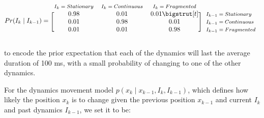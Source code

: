 \documentclass[times, twoside]{zHenriquesLab-StyleBioRxiv}
\begin{document}
\begin{equation*}
  Pr(I_{k} \mid I_{k-1}) = 
  \begin{blockarray}{*{3}{c} l}
    \begin{block}{*{3}{>{$\footnotesize}c<{$}} l}
      $I_{k} = Stationary$ & $I_{k} = Continuous$ & $I_{k} = Fragmented$ \\
    \end{block}
    \begin{block}{[*{3}{c}]>{$\footnotesize}l<{$}}
      0.98 & 0.01 & 0.01 \bigstrut[t]& $I_{k-1} = Stationary$ \\
      0.01 & 0.98 & 0.01 & $I_{k-1} = Continuous$ \\
      0.01 & 0.01 & 0.98 & $I_{k-1} = Fragmented$ \\
    \end{block}
  \end{blockarray}
\end{equation*}

to encode the prior expectation that each of the dynamics will last the average duration of 100 ms, with a small probability of changing to one of the other dynamics.

For the dynamics movement model $p(x_{k} \mid x_{k-1}, I_{k}, I_{k-1})$, which defines how likely the position $x_{k}$ is to change given the previous position $x_{k-1}$ and current $I_{k}$ and past dynamics $I_{k-1}$, we set it to be:
\end{document}
